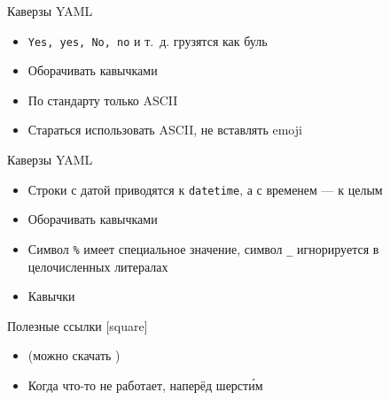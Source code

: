 \begin{frame}{Каверзы YAML}
  \begin{itemize}[<+-| alert@ +>]
    \item[{\faFrown[regular]}] \texttt{Yes, yes, No, no} и т.~д. грузятся
      как буль
    \item[{\faCheckCircle[regular]}] Оборачивать кавычками

    \vfill

    \item[{\faFrown[regular]}] По стандарту только ASCII
    \item[{\faCheckCircle[regular]}] Стараться использовать ASCII, не вставлять emoji
      \faSmile[regular]
  \end{itemize}
\end{frame}

\begin{frame}{Каверзы YAML}
  \begin{itemize}[<+-| alert@ +>]
    \item[{\faFrown[regular]}] Строки с датой приводятся к \texttt{datetime}, а с
      временем --- к целым
    \item[{\faCheckCircle[regular]}] Оборачивать кавычками

    \vfill

    \item[{\faFrown[regular]}] Символ \texttt{\%} имеет специальное значение, символ
      \texttt{\_} игнорируется в целочисленных литералах
    \item[{\faCheckCircle[regular]}] Кавычки
  \end{itemize}
\end{frame}

\begin{Frame}[c]{Полезные ссылки}
  [square]
  \begin{itemize}
    \item[\faBook]
       (можно скачать \faDownload)
    \item[\faGithub] Когда что-то не работает, наперёд шерст\'им
  \end{itemize}
\end{Frame}
